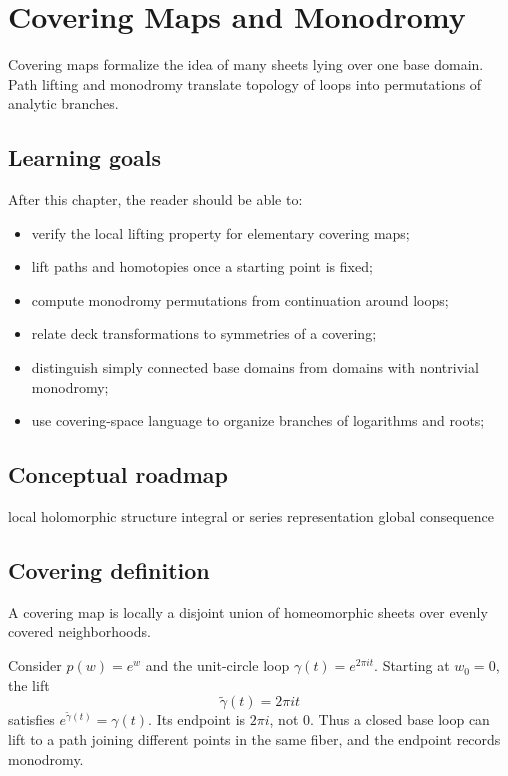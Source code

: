 \chapter{Covering Maps and Monodromy}
\label{ch:iv23}

Covering maps formalize the idea of many sheets lying over one base domain. Path lifting and monodromy translate topology of loops into permutations of analytic branches.

\section*{Learning goals}
After this chapter, the reader should be able to:
\begin{itemize}
\item verify the local lifting property for elementary covering maps;
\item lift paths and homotopies once a starting point is fixed;
\item compute monodromy permutations from continuation around loops;
\item relate deck transformations to symmetries of a covering;
\item distinguish simply connected base domains from domains with nontrivial monodromy;
\item use covering-space language to organize branches of logarithms and roots;
\end{itemize}
\section*{Conceptual roadmap}
\volroadmap
  {local holomorphic structure}
  {integral or series representation}
  {global consequence}

\section{Covering definition}
A covering map is locally a disjoint union of homeomorphic sheets over evenly covered neighborhoods.

\begin{example}\label{ex:iv23-expand-01}
Consider \(p(w)=e^w\) and the unit-circle loop \(\gamma(t)=e^{2\pi it}\). Starting at \(w_0=0\), the lift
\[
\widetilde\gamma(t)=2\pi it
\]
satisfies \(e^{\widetilde\gamma(t)}=\gamma(t)\). Its endpoint is \(2\pi i\), not \(0\). Thus a closed base loop can lift to a path joining different points in the same fiber, and the endpoint records monodromy.
\end{example}
